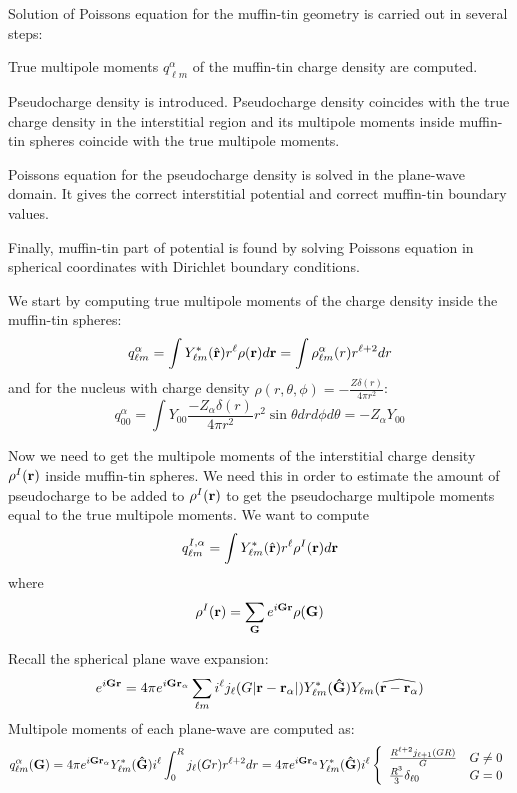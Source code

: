 Solution of Poisson\textquotesingle{}s equation for the muffin-\/tin geometry is carried out in several steps\+:
\begin{DoxyItemize}
\item True multipole moments $ q_{\ell m}^{\alpha} $ of the muffin-\/tin charge density are computed.
\item Pseudocharge density is introduced. Pseudocharge density coincides with the true charge density in the interstitial region and it\textquotesingle{}s multipole moments inside muffin-\/tin spheres coincide with the true multipole moments.
\item Poisson\textquotesingle{}s equation for the pseudocharge density is solved in the plane-\/wave domain. It gives the correct interstitial potential and correct muffin-\/tin boundary values.
\item Finally, muffin-\/tin part of potential is found by solving Poisson\textquotesingle{}s equation in spherical coordinates with Dirichlet boundary conditions.
\end{DoxyItemize}

We start by computing true multipole moments of the charge density inside the muffin-\/tin spheres\+: \[ q_{\ell m}^{\alpha} = \int Y_{\ell m}^{*}(\hat {\bf r}) r^{\ell} \rho({\bf r}) d {\bf r} = \int \rho_{\ell m}^{\alpha}(r) r^{\ell + 2} dr \] and for the nucleus with charge density $ \rho(r, \theta, \phi) = -\frac{Z \delta(r)}{4 \pi r^2} $\+: \[ q_{00}^{\alpha} = \int Y_{0 0} \frac{-Z_{\alpha} \delta(r)}{4 \pi r^2} r^2 \sin \theta dr d\phi d\theta = -Z_{\alpha} Y_{00} \]

Now we need to get the multipole moments of the interstitial charge density $ \rho^{I}({\bf r}) $ inside muffin-\/tin spheres. We need this in order to estimate the amount of pseudocharge to be added to $ \rho^{I}({\bf r}) $ to get the pseudocharge multipole moments equal to the true multipole moments. We want to compute \[ q_{\ell m}^{I,\alpha} = \int Y_{\ell m}^{*}(\hat {\bf r}) r^{\ell} \rho^{I}({\bf r}) d {\bf r} \] where \[ \rho^{I}({\bf r}) = \sum_{\bf G}e^{i{\bf Gr}} \rho({\bf G}) \]

Recall the spherical plane wave expansion\+: \[ e^{i{\bf G r}}=4\pi e^{i{\bf G r}_{\alpha}} \sum_{\ell m} i^\ell j_{\ell}(G|{\bf r}-{\bf r}_{\alpha}|) Y_{\ell m}^{*}({\bf \hat G}) Y_{\ell m}(\widehat{{\bf r}-{\bf r}_{\alpha}}) \] Multipole moments of each plane-\/wave are computed as\+: \[ q_{\ell m}^{\alpha}({\bf G}) = 4 \pi e^{i{\bf G r}_{\alpha}} Y_{\ell m}^{*}({\bf \hat G}) i^{\ell} \int_{0}^{R} j_{\ell}(Gr) r^{\ell + 2} dr = 4 \pi e^{i{\bf G r}_{\alpha}} Y_{\ell m}^{*}({\bf \hat G}) i^{\ell} \left\{\begin{array}{ll} \frac{R^{\ell + 2} j_{\ell + 1}(GR)}{G} & G \ne 0 \\ \frac{R^3}{3} \delta_{\ell 0} & G = 0 \end{array} \right. \]

